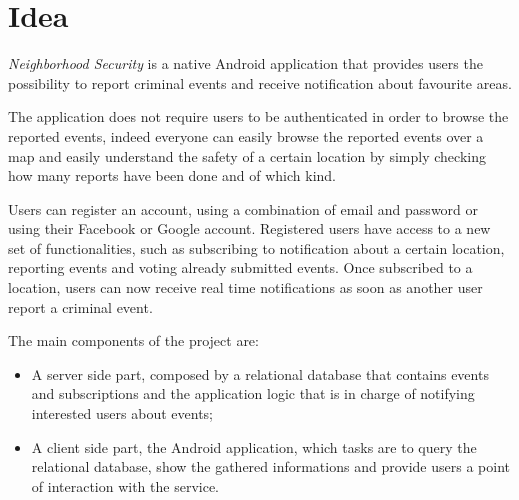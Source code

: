 \documentclass[a4paper]{scrreprt}
\begin{document}
\section{Idea}
\emph{Neighborhood Security} is a native Android application that provides  users the possibility to report criminal events and receive notification about favourite areas.
\par The application does not require users to be authenticated in order to browse the reported events, indeed everyone can easily  browse the reported events over a map and easily understand the safety of a certain location by simply checking how many reports have been done and of which kind.
\par Users can register an account, using a combination of email and password or using their Facebook or Google account. Registered users have access to a new set of functionalities, such as  subscribing to notification about a certain location, reporting events and voting already submitted events. Once subscribed to a location, users can now receive real time notifications as soon as another user report a criminal event.
\par The main components of the project are:
\begin{itemize}
\item A server side part, composed by a relational database that contains events and subscriptions and the application logic that is in charge of notifying interested users about events;
\item A client side part, the Android application,  which tasks are to query the relational database, show the gathered informations and provide users a point of interaction with the service.

\end{itemize}
\end{document}
